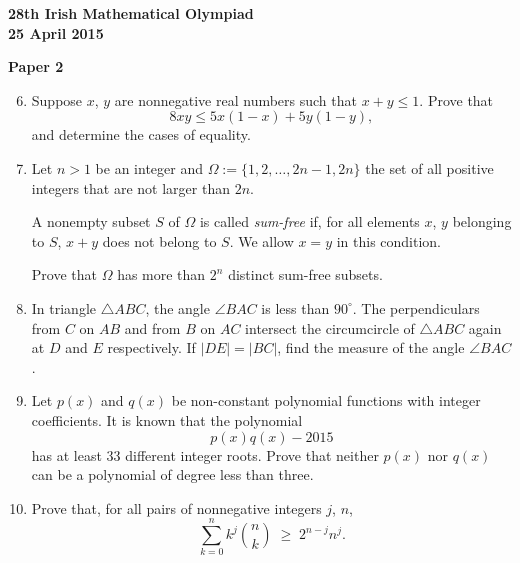 \documentclass[12pt]{article}
\begin{document}
\newpage
\begin{center}
{\large\bfseries 28th Irish Mathematical Olympiad\\25 April 2015}
\end{center}
\bigskip\noindent\textbf{Paper 2}\bigskip
\begin{enumerate}
\setcounter{enumi}{5}
\item Suppose $x$, $y$ are nonnegative real numbers such that $x + y \leq 1$. Prove that
\[
8xy \leq 5x(1-x) + 5y(1-y),
\]
and determine the cases of equality.

\item Let $n > 1$ be an integer and $\Omega := \{1, 2, \ldots, 2n-1, 2n\}$ the set of all positive integers that are not larger than $2n$.

A nonempty subset $S$ of $\Omega$ is called \emph{sum-free} if, for all elements $x$, $y$ belonging to $S$, $x + y$ does not belong to $S$. We allow $x = y$ in this condition.

Prove that $\Omega$ has more than $2^n$ distinct sum-free subsets.

\item In triangle $\triangle ABC$, the angle $\angle BAC$ is less than $90^\circ$. The perpendiculars from $C$ on $AB$ and from $B$ on $AC$ intersect the circumcircle of $\triangle ABC$ again at $D$ and $E$ respectively. If $|DE| = |BC|$, find the measure of the angle $\angle BAC$.

\item Let $p(x)$ and $q(x)$ be non-constant polynomial functions with integer coefficients. It is known that the polynomial
\[
p(x)q(x) - 2015
\]
has at least 33 different integer roots. Prove that neither $p(x)$ nor $q(x)$ can be a polynomial of degree less than three.

\item Prove that, for all pairs of nonnegative integers $j$, $n$,
\[
\sum_{k=0}^{n} k^j \binom{n}{k} \;\geq\; 2^{n-j} n^j.
\]
\end{enumerate}
\end{document}
